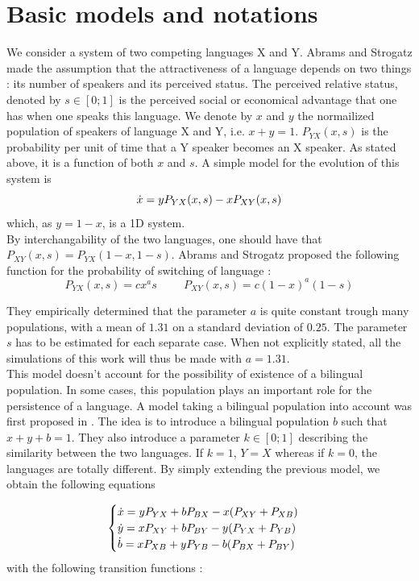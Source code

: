 \documentclass{article}
\begin{document}
\section{Basic models and notations}
\label{sec:basic}
We consider a system of two competing languages X and Y.
Abrams and Strogatz made the assumption that the attractiveness of a language depends on two things : its number of speakers and its perceived status.
The perceived relative status, denoted by $s \in [0;1]$ is the perceived social or economical advantage that one has when one speaks this language.
We denote by $x$ and $y$ the normailized population of speakers of language X and Y, i.e. $x+y=1$. $P_{YX}(x, s)$ is the probability per unit of time that a Y speaker becomes an X speaker. As stated above, it is a function of both $x$ and $s$.
A simple model for the evolution of this system is
\begin{equation}
\label{eq:1dsimple}
\dot{x} = yP_{YX}(x, s) - xP_{XY}(x, s)
\end{equation}
which, as $y = 1-x$, is a 1D system. \\
By interchangability of the two languages, one should have that $P_{XY}(x, s) = P_{YX}(1-x, 1-s)$. Abrams and Strogatz proposed the following function for the probability of switching of language :
\[ P_{YX}(x,s) = cx^as \hspace{1cm} P_{XY}(x,s) = c(1-x)^a(1-s) \]

They empirically determined that the parameter $a$ is quite constant trough many populations, with a mean of $1.31$ on a standard deviation of $0.25$. The parameter $s$ has to be estimated for each separate case. When not explicitly stated, all the simulations of this work will thus be made with $a=1.31$.\\

This model doesn't account for the possibility of existence of a bilingual population.
In some cases, this population plays an important role for the persistence of a language.
A model taking a bilingual population into account was first proposed in \cite{BAGGS19939}.
The idea is to introduce a bilingual population $b$ such that $x+y+b=1$.
They also introduce a parameter $k \in [0;1]$ describing the similarity between the two languages.
If $k = 1$, $Y = X$ whereas if $k = 0$, the languages are totally different.
By simply extending the previous model, we obtain the following equations

\begin{equation}
\label{eq:bil}
\begin{cases}
\dot{x} = yP_{YX} + bP_{BX} - x(P_{XY} + P_{XB}) \\
\dot{y} = xP_{XY} + bP_{BY} - y(P_{YX} + P_{YB}) \\
\dot{b} = xP_{XB} + yP_{YB} - b(P_{BX} + P_{BY}) \\
\end{cases}
\end{equation}
with the following transition functions :
\end{document}
